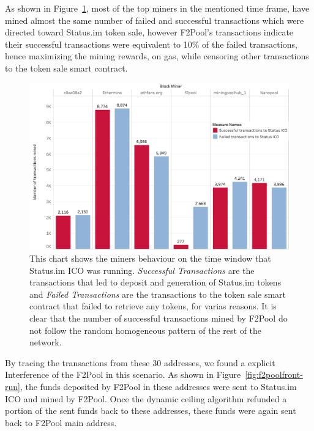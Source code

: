 As shown in Figure~\ref{fig:Transactions_miners_while_status_ico_cut}, most of the top miners in the mentioned time frame, have mined almost the same number of failed and successful transactions which were directed toward Status.im token sale, however F2Pool's transactions indicate their successful transactions were equivalent to 10\% of the failed transactions, hence maximizing the mining rewards, on gas, while censoring other transactions to the token sale smart contract.


\begin{figure}[h]
\centering
\includegraphics[width=0.7\linewidth]{figures/Transactions_miners_while_status_ico_cut_only_icotx.png}
\caption{This chart shows the miners behaviour on the time window that Status.im ICO was running. \textit{Successful Transactions} are the transactions that led to deposit and generation of Status.im tokens and \textit{Failed Transactions} are the transactions to the token sale smart contract that failed to retrieve any tokens, for varias reasons.  It is clear that the number of successful transactions mined by F2Pool do not follow the random homogeneous pattern of the rest of the network. \label{fig:Transactions_miners_while_status_ico_cut}} 
\end{figure}





By tracing the transactions from these 30 addresses, we found a explicit Interference of the F2Pool in this scenario. As shown in Figure~\ref{fig:f2poolfront-run}, the funds deposited by F2Pool in these addresses were sent to Status.im ICO and mined by F2Pool. Once the dynamic ceiling algorithm refunded a portion of the sent funds back to these addresses, these funds were again sent back to F2Pool main address. 


